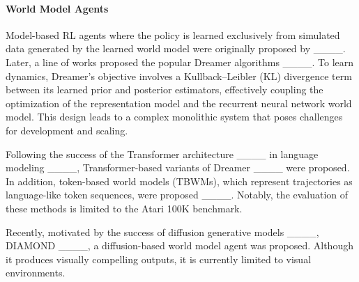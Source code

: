 \paragraph{World Model Agents}
Model-based RL agents where the policy is learned exclusively from simulated data generated by the learned world model were originally proposed by ____.
Later, a line of works proposed the popular Dreamer algorithms ____.
To learn dynamics, Dreamer's objective involves a Kullback–Leibler (KL) divergence term between its learned prior and posterior estimators, effectively coupling the optimization of the representation model and the recurrent neural network world model.
This design leads to a complex monolithic system that poses challenges for development and scaling.

Following the success of the Transformer architecture ____ in language modeling ____, Transformer-based variants of Dreamer ____ were proposed.
In addition, token-based world models (TBWMs), which represent trajectories as language-like token sequences, were proposed ____.
Notably, the evaluation of these methods is limited to the Atari 100K benchmark.

Recently, motivated by the success of diffusion generative models ____, DIAMOND ____, a diffusion-based world model agent was proposed.
Although it produces visually compelling outputs, it is currently limited to visual environments.










